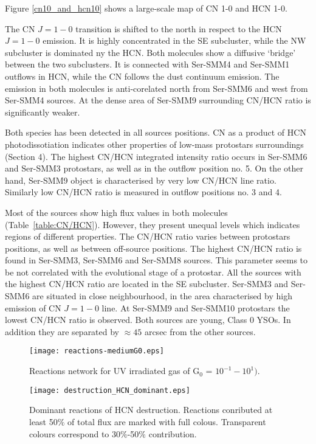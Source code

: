 \documentclass{aa}
\begin{document}
Figure \ref{cn10_and_hcn10} shows a large-scale map of CN 1-0 and HCN 1-0. 

The CN $J=1-0$ transition is shifted to the north in respect to the HCN $J=1-0$ emission. It is
highly concentrated in the SE subcluster, while the NW subcluster is dominated ny the HCN. Both
molecules show a diffusive ‘bridge’ between the two subclusters. It is connected with Ser-SMM4 and
Ser-SMM1 outflows in HCN, while the CN follows the dust continuum emission. The emission in both
molecules is anti-corelated north from Ser-SMM6 and west from Ser-SMM4 sources. At the dense area of
Ser-SMM9 surrounding CN/HCN ratio is significantly weaker.

Both species has been detected in all sources positions. CN as a product of HCN photodissotiation
indicates other properties of low-mass protostars surroundings (Section 4). The highest CN/HCN
integrated intensity ratio occurs in Ser-SMM6 and Ser-SMM3 protostars, as well as in the outflow
position no. 5. On the other hand, Ser-SMM9 object is characterised by very low CN/HCN line ratio.
Similarly low CN/HCN ratio is measured in outflow positions no. 3 and 4.

Most of the sources show high flux values in both molecules (Table~\ref{table:CN/HCN}). However,
they present unequal levels which indicates regions of different properties. The CN/HCN ratio varies
between protostars positions, as well as between off-source positions. The highest CN/HCN ratio is
found in Ser-SMM3, Ser-SMM6 and Ser-SMM8 sources. This parameter seems to be not correlated with the
evolutional stage of a protostar. All the sources with the highest CN/HCN ratio are located in the
SE subcluster. Ser-SMM3 and Ser-SMM6 are situated in close neighbourhood, in the area characterised
by high emission of CN $J=1-0$ line. At Ser-SMM9 and Ser-SMM10 protostars the lowest CN/HCN ratio is
observed. Both sources are young, Class 0 YSOs. In addition they are separated by $\approx 45$
arcsec from the other sources.


\begin{figure} 
\texttt{[image: reactions-mediumG0.eps]} 
\caption{Reactions network for UV irradiated gas of G$_0$ = $10^{-1} - 10^{1})$.}
\label{reactions_mediumG0} 
\end{figure}
\begin{figure} 
\texttt{[image: destruction\_HCN\_dominant.eps]} 
\caption{Dominant reactions
of HCN destruction. Reactions conributed at least 50$\%$ of total flux are marked with full colous.
Transparent colours correspond to 30$\%$-50$\%$ contribution.} 
\label{HCN_dest} 
\end{figure}
\end{document}
